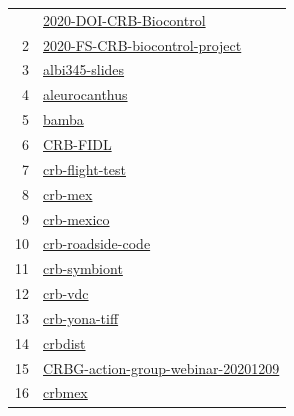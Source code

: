 \begin{longtable}{rl}
	\bottomrule
	\endlastfoot
	1 &                           \href{https://github.com/aubreymoore/2020-DOI-CRB-Biocontrol}{2020-DOI-CRB-Biocontrol} \\
	2 &             \href{https://github.com/aubreymoore/2020-FS-CRB-biocontrol-project}{2020-FS-CRB-biocontrol-project} \\
	3 &                                             \href{https://github.com/aubreymoore/albi345-slides}{albi345-slides} \\
	4 &                                               \href{https://github.com/aubreymoore/aleurocanthus}{aleurocanthus} \\
	5 &                                                               \href{https://github.com/aubreymoore/bamba}{bamba} \\
	6 &                                                         \href{https://github.com/aubreymoore/CRB-FIDL}{CRB-FIDL} \\
	7 &                                           \href{https://github.com/aubreymoore/crb-flight-test}{crb-flight-test} \\
	8 &                                                           \href{https://github.com/aubreymoore/crb-mex}{crb-mex} \\
	9 &                                                     \href{https://github.com/aubreymoore/crb-mexico}{crb-mexico} \\
	10 &                                       \href{https://github.com/aubreymoore/crb-roadside-code}{crb-roadside-code} \\
	11 &                                                 \href{https://github.com/aubreymoore/crb-symbiont}{crb-symbiont} \\
	12 &                                                           \href{https://github.com/aubreymoore/crb-vdc}{crb-vdc} \\
	13 &                                               \href{https://github.com/aubreymoore/crb-yona-tiff}{crb-yona-tiff} \\
	14 &                                                           \href{https://github.com/aubreymoore/crbdist}{crbdist} \\
	15 &     \href{https://github.com/aubreymoore/CRBG-action-group-webinar-20201209}{CRBG-action-group-webinar-20201209} \\
	16 &                                                             \href{https://github.com/aubreymoore/crbmex}{crbmex} \\

\end{longtable}

